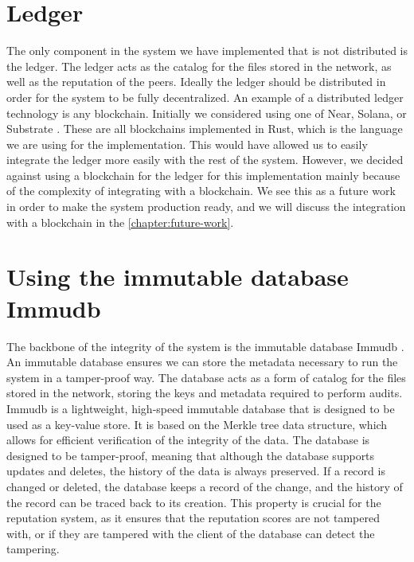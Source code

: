 \section{Ledger}

The only component in the system we have implemented that is not distributed is the ledger.
The ledger acts as the catalog for the files stored in the network,
as well as the reputation of the peers.
Ideally the ledger should be distributed in order for the system to be fully decentralized.
An example of a distributed ledger technology is any blockchain.
Initially we considered using one of Near, Solana, or Substrate \cite{near, solana, substrate}.
These are all blockchains implemented in Rust, which is the language we are using for the implementation.
This would have allowed us to easily integrate the ledger more easily with the rest of the system.
However, we decided against using a blockchain for the ledger for this implementation
mainly because of the complexity of integrating with a blockchain.
We see this as a future work in order to make the system production ready,
and we will discuss the integration with a blockchain in the \autoref{chapter:future-work}.

\section{Using the immutable database Immudb}
\label{section:using-immudb}

The backbone of the integrity of the system is the immutable database Immudb \cite{immudb}.
An immutable database ensures we can store the metadata necessary to run the system
in a tamper-proof way.
The database acts as a form of catalog for the files stored in the network,
storing the keys and metadata required to perform audits.
Immudb is a lightweight, high-speed immutable database that is designed to be used as a key-value store.
It is based on the Merkle tree data structure, which allows for efficient verification of the integrity of the data.
The database is designed to be tamper-proof, meaning that although the database supports updates and deletes,
the history of the data is always preserved.
If a record is changed or deleted,
the database keeps a record of the change, and the history of the record can be traced back to its creation.
This property is crucial for the reputation system, as it ensures that the reputation scores are not tampered with,
or if they are tampered with the client of the database can detect the tampering.

